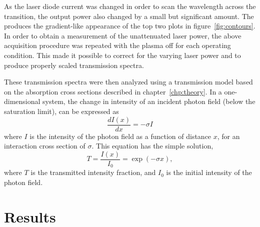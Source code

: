 As the laser diode current was changed in order to scan the wavelength across
the transition, the output power also changed by a small but significant amount.
The produces the gradient-like appearance of the top two plots in
figure~\ref{fig:contours}. In order to obtain a measurement of the unattenuated
laser power, the above acquisition procedure was repeated with the plasma off
for each operating condition. This made it possible to correct for the varying
laser power and to produce properly scaled transmission spectra.

These transmission spectra were then analyzed using a transmission model based
on the absorption cross sections described in chapter~\ref{chp:theory}. In a
one-dimensional system, the change in intensity of an incident photon field
(below the saturation limit), can be expressed as
\begin{equation}
  \frac{dI(x)}{dx} = -\sigma I
\end{equation}
where $I$ is the intensity of the photon field as a function of distance $x$,
for an interaction cross section of $\sigma$. This equation has the simple
solution,
\begin{equation}
  T = \frac{I(x)}{I_0} = \exp(-\sigma x),
\end{equation}
where $T$ is the transmitted intensity fraction, and $I_0$ is the initial
intensity of the photon field.

\section{Results}


